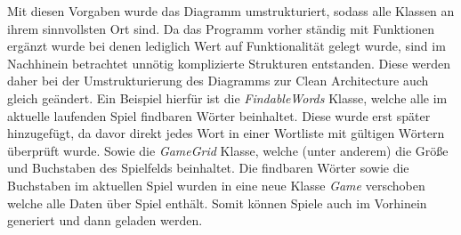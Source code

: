 Mit diesen Vorgaben wurde das Diagramm umstrukturiert, sodass alle Klassen an ihrem sinnvollsten Ort sind. Da das Programm vorher ständig mit Funktionen ergänzt wurde bei denen lediglich Wert auf Funktionalität gelegt wurde, sind im Nachhinein betrachtet unnötig komplizierte Strukturen entstanden. Diese werden daher bei der Umstrukturierung des Diagramms zur Clean Architecture auch gleich geändert. 
Ein Beispiel hierfür ist die \textit{FindableWords} Klasse, welche alle im aktuelle laufenden Spiel findbaren Wörter beinhaltet. Diese wurde erst später hinzugefügt, da davor direkt jedes Wort in einer Wortliste mit gültigen Wörtern überprüft wurde. Sowie die \textit{GameGrid} Klasse, welche (unter anderem) die Größe und Buchstaben des Spielfelds beinhaltet. Die findbaren Wörter sowie die Buchstaben im aktuellen Spiel wurden in eine neue Klasse \textit{Game} verschoben welche alle Daten über Spiel enthält. Somit können Spiele auch im Vorhinein generiert und dann geladen werden.

\endinput